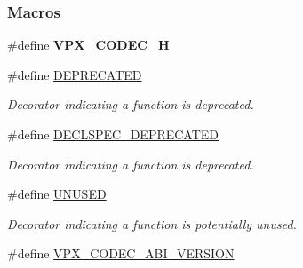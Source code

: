 \subsubsection*{Macros}
\begin{DoxyCompactItemize}
\item 
\hypertarget{group__codec_ga148a1b7418b30ecd9abb3413782aecd1}{\#define {\bfseries V\-P\-X\-\_\-\-C\-O\-D\-E\-C\-\_\-\-H}}\label{group__codec_ga148a1b7418b30ecd9abb3413782aecd1}

\item 
\hypertarget{group__codec_gac1e8a42306d8e67cb94ca31c3956ee78}{\#define \hyperlink{group__codec_gac1e8a42306d8e67cb94ca31c3956ee78}{D\-E\-P\-R\-E\-C\-A\-T\-E\-D}}\label{group__codec_gac1e8a42306d8e67cb94ca31c3956ee78}

\begin{DoxyCompactList}\small\item\em Decorator indicating a function is deprecated. \end{DoxyCompactList}\item 
\#define \hyperlink{group__codec_gab61b56b074706ee8423d864b511212ad}{D\-E\-C\-L\-S\-P\-E\-C\-\_\-\-D\-E\-P\-R\-E\-C\-A\-T\-E\-D}
\begin{DoxyCompactList}\small\item\em Decorator indicating a function is deprecated. \end{DoxyCompactList}\item 
\hypertarget{group__codec_gaddf5ec070e9499d36b7f2009ce736076}{\#define \hyperlink{group__codec_gaddf5ec070e9499d36b7f2009ce736076}{U\-N\-U\-S\-E\-D}}\label{group__codec_gaddf5ec070e9499d36b7f2009ce736076}

\begin{DoxyCompactList}\small\item\em Decorator indicating a function is potentially unused. \end{DoxyCompactList}\item 
\hypertarget{group__codec_gaf7e9cad2df0f81679b881f46740ad097}{\#define \hyperlink{group__codec_gaf7e9cad2df0f81679b881f46740ad097}{V\-P\-X\-\_\-\-C\-O\-D\-E\-C\-\_\-\-A\-B\-I\-\_\-\-V\-E\-R\-S\-I\-O\-N}}\label{group__codec_gaf7e9cad2df0f81679b881f46740ad097}


\end{DoxyCompactItemize}
